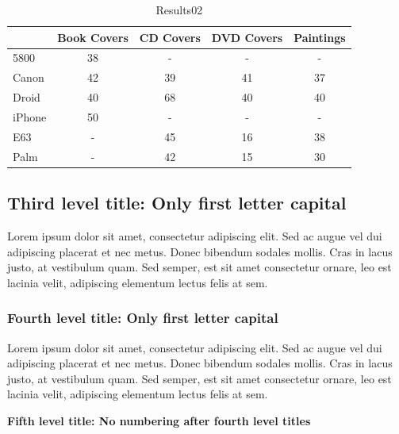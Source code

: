 \begin{table}
{\setlength{\tabcolsep}{14pt}
\caption{Results02}
\begin{center}
  \begin{tabular}{ |l | c | c | c | c | }
    \hline
    		   &Book Covers & CD Covers & DVD Covers & Paintings \\ \hline 
    5800   & 38         & -         & -          & -         \\ \hline 
    Canon  & 42         & 39        & 41         & 37        \\ \hline 
    Droid  & 40         & 68        & 40         & 40        \\ \hline 
    iPhone & 50         & -         & -          & -         \\ \hline 
    E63    & -          & 45	       & 16         & 38        \\ \hline 
    Palm   & -          & 42        & 15         & 30        \\ \hline

  \end{tabular}
\end{center}
\label{results02}}
\end{table}


\subsection{Third level title: Only first letter capital}

Lorem ipsum dolor sit amet, consectetur adipiscing elit. Sed ac augue vel dui 
adipiscing placerat et nec metus. Donec bibendum sodales mollis. Cras in lacus 
justo, at vestibulum quam. Sed semper, est sit amet consectetur ornare, leo est 
lacinia velit, adipiscing elementum lectus felis at sem.

\subsubsection{Fourth level title: Only first letter capital}

Lorem ipsum dolor sit amet, consectetur adipiscing elit. Sed ac augue vel dui 
adipiscing placerat et nec metus. Donec bibendum sodales mollis. Cras in lacus 
justo, at vestibulum quam. Sed semper, est sit amet consectetur ornare, leo est 
lacinia velit, adipiscing elementum lectus felis at sem.

{\bf Fifth level title: No numbering
after fourth level titles}

